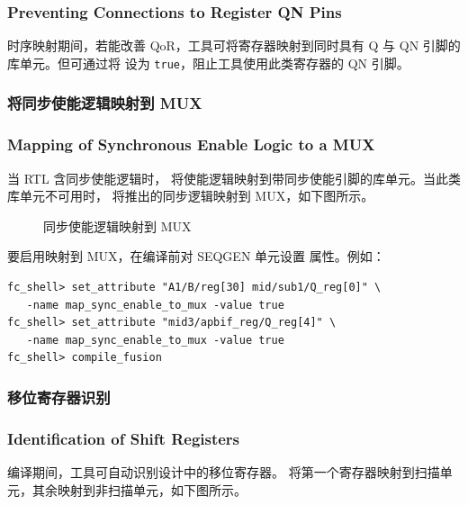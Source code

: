 \subsubsection*{Preventing Connections to Register QN Pins}

时序映射期间，若能改善 QoR，工具可将寄存器映射到同时具有 Q 与 QN 引脚的库单元。但可通过将  设为 \texttt{true}，阻止工具使用此类寄存器的 QN 引脚。

\subsubsection{将同步使能逻辑映射到 MUX}
\subsubsection*{Mapping of Synchronous Enable Logic to a MUX}

当 RTL 含同步使能逻辑时， 将使能逻辑映射到带同步使能引脚的库单元。当此类库单元不可用时， 将推出的同步逻辑映射到 MUX，如下图所示。

\begin{figure}[htbp]
\centering
{}
\caption{同步使能逻辑映射到 MUX}
\label{fig:sync-en-mux}
\end{figure}

要启用映射到 MUX，在编译前对 SEQGEN 单元设置  属性。例如：
\begin{lstlisting}
fc_shell> set_attribute "A1/B/reg[30] mid/sub1/Q_reg[0]" \
   -name map_sync_enable_to_mux -value true
fc_shell> set_attribute "mid3/apbif_reg/Q_reg[4]" \
   -name map_sync_enable_to_mux -value true
fc_shell> compile_fusion
\end{lstlisting}

\subsubsection{移位寄存器识别}
\subsubsection*{Identification of Shift Registers}

编译期间，工具可自动识别设计中的移位寄存器。 将第一个寄存器映射到扫描单元，其余映射到非扫描单元，如下图所示。

